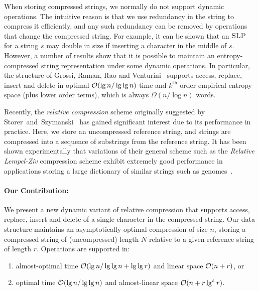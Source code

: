 When storing compressed strings, we normally do not support dynamic operations. The intuitive reason is that we use redundancy in the string to compress it efficiently, and any such redundancy can be removed by operations that change the compressed string. For example, it can be shown that an $\textsc{SLP}$ for a string $s$ may double in size if inserting a character in the middle of $s$. 
However, a number of results show that it is possible to maintain an entropy-compressed string representation under some dynamic operations. In particular, the structure of Grossi, Raman, Rao and Venturini~\cite{grossi2013} supports access, replace, insert and delete in optimal $\mathcal{O}(\lg n/\lg \lg n)$ time and $k^\text{th}$ order empirical entropy space (plus lower order terms), which is always $\Omega(n / \log n)$ words.

Recently, the \emph{relative compression} scheme originally suggested by Storer~and~Szymanski~\cite{SS1978,Storer1982} has gained significant interest due to its performance in practice. Here, we store an uncompressed reference string, and strings are compressed into a sequence of substrings from the reference string. It has been shown experimentally that variations of their general scheme such as the \emph{Relative Lempel-Ziv} compression scheme exhibit extremely good performance in applications storing a large dictionary of similar strings such as genomes~\cite{ferragina2013bit,kuruppu2011optimized,chern2012reference,do2014fast,hoobin2011relative,kuruppu2011reference,wandelt2013fresco,deorowicz2011robust,wandelt2012adaptive,ochoa2014idocomp}. 


\paragraph{Our Contribution: }
We present a new dynamic variant of relative compression that supports access, replace, insert and delete of a single character in the compressed string. Our data structure maintains an asymptotically optimal compression of size $n$, storing a compressed string of (uncompressed) length $N$ relative to a given reference string of length $r$. 
Operations are supported in:
\begin{enumerate}
    \item almost-optimal time $\mathcal{O}(\lg n / \lg \lg n + \lg \lg r)$ and linear space $\mathcal{O}(n+r)$, or 
    \item optimal time $\mathcal{O}(\lg n / \lg \lg n)$ and almost-linear space $\mathcal{O}(n+r \lg^{\upvarepsilon} r)$.
\end{enumerate}

